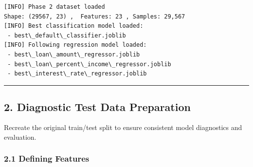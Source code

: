 \documentclass[11pt]{article}
\begin{document}
    \begin{Verbatim}[commandchars=\\\{\}]
[INFO] Phase 2 dataset loaded
Shape: (29567, 23) ,  Features: 23 , Samples: 29,567
[INFO] Best classification model loaded:
 - best\_default\_classifier.joblib
[INFO] Following regression model loaded:
 - best\_loan\_amount\_regressor.joblib
 - best\_loan\_percent\_income\_regressor.joblib
 - best\_interest\_rate\_regressor.joblib
    \end{Verbatim}

    \begin{center}\rule{0.5\linewidth}{0.5pt}\end{center}

\subsection{\texorpdfstring{\textbf{2. Diagnostic Test Data
Preparation}}{2. Diagnostic Test Data Preparation}}\label{diagnostic-test-data-preparation}

Recreate the original train/test split to ensure consistent model
diagnostics and evaluation.

\subsubsection{\texorpdfstring{\textbf{2.1 Defining
Features}}{2.1 Defining Features}}\label{defining-features}
\end{document}
